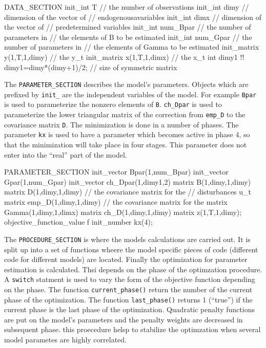 DATA_SECTION
  init_int T // the number of observations
  init_int dimy // dimension of the vector of 
                // endogenousavariables
  init_int dimx // dimension of the vector of 
                // predetermined variables 
  init_int num_Bpar // the number of parameters in
                // the elements of B to be estimated 
  init_int num_Gpar // the number of parameters in
                // the elements of Gamma to be estimated 
  init_matrix y(1,T,1,dimy) // the y_t
  init_matrix x(1,T,1,dimx) // the x_t
  int dimy1
 !! dimy1=dimy*(dimy+1)/2;  // size of symmetric matrix
\endexample

The {\tt PARAMETER\_SECTION} describes the model's parameters.
Objects which are prefixed by {\tt init\_} are the independent
variables of the model.  For example {\tt Bpar} is used to
parameterize the nonzero elements of {\tt B}.
{\tt ch\_Dpar} is used to parameterize the lower triangular matrix
of the correction from {\tt emp\_D} to the covariance matrix
{\tt D}. The minimization is done in a number of phases.
The parameter {\tt kx} is used to have a parameter which becomes active
in phase 4, so that the minimization will take place in four stages.
This parameter does not enter into the ``real'' part of the model.

\beginexample
PARAMETER_SECTION
  init_vector Bpar(1,num_Bpar)
  init_vector Gpar(1,num_Gpar)
  init_vector ch_Dpar(1,dimy1,2)
  matrix B(1,dimy,1,dimy)
  matrix D(1,dimy,1,dimy)  // the covariance matrix for the 
                           // disturbances u_t
  matrix emp_D(1,dimy,1,dimy)  // the covariance matrix for the 
  matrix Gamma(1,dimy,1,dimx)
  matrix ch_D(1,dimy,1,dimy)
  matrix z(1,T,1,dimy);
  objective_function_value f
  init_number kx(4);
\endexample

The {\tt PROCEDURE\_SECTION} is where the models calculations
are carried out. It is split up into a set of functions wheere the
model specific pieces of code (different code for different models)
are located. Finally  the optimization for parameter estimation is
calculated. Thsi depends on the phase of the optimzation procedure.
A {\tt switch} statment is used to vary the form of the objective
function depending on the phase. The function {\tt current\_phase()}
return the number of the current phase of the optimization.
The function {\tt last\_phase()}
returns 1 (``true'') if the current phase is the last phase of the
optimization. Quadratic penalty functions are put on the model's
parameters and the penalty weights are decreased in subsequent phase.
this proecedure helsp to stabilize the optimzation when several
model parametes are highly correlated.


